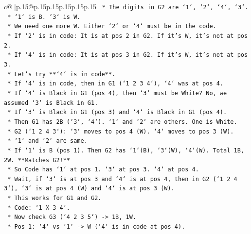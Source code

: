 \documentclass{article}
\begin{document}
{\begin{supertabular}{c@{$\;$}|p{.15\linewidth}@{}p{.15\linewidth}p{.15\linewidth}p{.15\linewidth}p{.15\linewidth}p{.15\linewidth}}
{{{\texttt{                        *   The digits in G2 are `1`, `2`, `4`, `3`.} \\
\texttt{                        *   `1` is B. `3` is W.} \\
\texttt{                        *   We need one more W. Either `2` or `4` must be in the code.} \\
\texttt{                        *   If `2` is in code: It is at pos 2 in G2. If it's W, it's not at pos 2.} \\
\texttt{                        *   If `4` is in code: It is at pos 3 in G2. If it's W, it's not at pos 3.} \\
\texttt{                        *   Let's try **`4` is in code**.} \\
\texttt{                        *   If `4` is in code, then in G1 (`1 2 3 4`), `4` was at pos 4.} \\
\texttt{                        *   If `4` is Black in G1 (pos 4), then `3` must be White? No, we assumed `3` is Black in G1.} \\
\texttt{                        *   If `3` is Black in G1 (pos 3) and `4` is Black in G1 (pos 4).} \\
\texttt{                            *   Then G1 has 2B (`3`, `4`). `1` and `2` are others. One is White.} \\
\texttt{                            *   G2 (`1 2 4 3`): `3` moves to pos 4 (W). `4` moves to pos 3 (W).} \\
\texttt{                            *   `1` and `2` are same.} \\
\texttt{                            *   If `1` is B (pos 1). Then G2 has `1`(B), `3`(W), `4`(W). Total 1B, 2W. **Matches G2!**} \\
\texttt{                            *   So Code has `1` at pos 1. `3` at pos 3. `4` at pos 4.} \\
\texttt{                            *   Wait, if `3` is at pos 3 and `4` is at pos 4, then in G2 (`1 2 4 3`), `3` is at pos 4 (W) and `4` is at pos 3 (W).} \\
\texttt{                            *   This works for G1 and G2.} \\
\texttt{                            *   Code: `1 X 3 4`.} \\
\texttt{                            *   Now check G3 (`4 2 3 5`) {-}> 1B, 1W.} \\
\texttt{                                *   Pos 1: `4` vs `1` {-}> W (`4` is in code at pos 4).} \\
}}}
\end{supertabular}}
\end{document}
